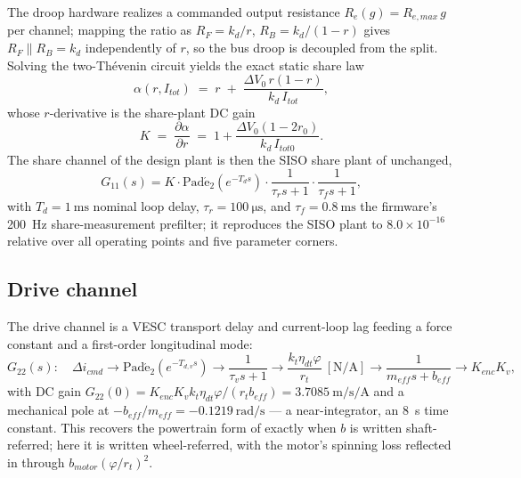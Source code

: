 \documentclass[energies,article,submit,pdftex,oneauthor]{Definitions/mdpi}
\begin{document}
The droop hardware realizes a commanded output resistance $R_e(g) = R_{e,max}\,g$ per channel;
mapping the ratio as $R_F = k_d/r$, $R_B = k_d/(1-r)$ gives $R_F \parallel R_B = k_d$
independently of $r$, so the bus droop is decoupled from the split. Solving the two-Th\'evenin
circuit yields the exact static share law \citep{internal:droop}
\begin{equation}\label{eq:share}
\alpha(r, I_{tot}) \;=\; r \;+\; \frac{\Delta V_0\, r(1-r)}{k_d\, I_{tot}},
\end{equation}
whose $r$-derivative is the share-plant DC gain
\begin{equation}\label{eq:K}
K \;=\; \frac{\partial\alpha}{\partial r} \;=\; 1 + \frac{\Delta V_0 (1-2r_0)}{k_d\, I_{tot0}} .
\end{equation}
The share channel of the design plant is then the SISO share plant of \citep{internal:droop}
unchanged,
\begin{equation}\label{eq:G11}
G_{11}(s) = K\cdot \mathrm{Pad\acute{e}}_2\!\left(e^{-T_d s}\right)\cdot
\frac{1}{\tau_r s + 1}\cdot\frac{1}{\tau_f s + 1},
\end{equation}
with $T_d = \SI{1}{\milli\second}$ nominal loop delay, $\tau_r = \SI{100}{\micro\second}$, and
$\tau_f = \SI{0.8}{\milli\second}$ the firmware's \SI{200}{\hertz} share-measurement prefilter;
it reproduces the SISO plant to $8.0\times10^{-16}$ relative over all operating points and five
parameter corners.

\subsection{Drive channel}

The drive channel is a VESC transport delay and current-loop lag feeding a force constant and a
first-order longitudinal mode:
\begin{equation}\label{eq:G22}
G_{22}(s):\quad \Delta i_{cmd} \to \mathrm{Pad\acute{e}}_2\!\left(e^{-T_{d,v} s}\right)
\to \frac{1}{\tau_v s + 1} \to \frac{k_t \eta_{dt}\varphi}{r_t}\ [\si{\newton\per\ampere}]
\to \frac{1}{m_{\!e\!f\!f} s + b_{\!e\!f\!f}} \to K_{enc}K_v ,
\end{equation}
with DC gain $G_{22}(0) = K_{enc}K_v k_t \eta_{dt}\varphi/(r_t b_{\!e\!f\!f}) =
\SI{3.7085}{\meter\per\second\per\ampere}$ and a mechanical pole at
$-b_{\!e\!f\!f}/m_{\!e\!f\!f} = \SI{-0.1219}{\radian\per\second}$ --- a near-integrator, an
\SI{8}{\second} time constant. This recovers the powertrain form of \citep{tan2025scaling}
exactly when $b$ is written shaft-referred; here it is written wheel-referred, with the motor's
spinning loss reflected in through $b_{motor}(\varphi/r_t)^2$.
\end{document}
